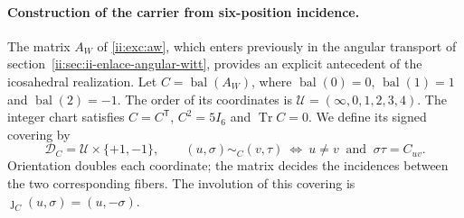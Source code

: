 \paragraph{Construction of the carrier from six-position incidence.}
\label{ii:ii:ico:construccion-firmada}
The matrix \(A_W\) of \eqref{ii:exc:aw}, which enters previously in the
angular transport of section~\ref{ii:sec:ii-enlace-angular-witt}, provides
an explicit antecedent of the icosahedral realization. Let
\(C=\operatorname{bal}(A_W)\), where
\(\operatorname{bal}(0)=0\), \(\operatorname{bal}(1)=1\) and
\(\operatorname{bal}(2)=-1\). The order of its coordinates is
\(\mathcal U=(\infty,0,1,2,3,4)\). The integer chart satisfies
\(C=C^{\mathsf T}\), \(C^2=5I_6\) and \(\operatorname{Tr}C=0\).
We define its signed covering by
\begin{equation}
 \mathcal D_C=\mathcal U\times\{+1,-1\},\qquad
 (u,\sigma)\sim_C(v,\tau)
 \ \Longleftrightarrow\ u\ne v\ \text{ and }\ \sigma\tau=C_{uv}.
 \label{ii:ii:ico:incidencia-firmada}
\end{equation}
Orientation doubles each coordinate; the matrix decides the incidences
between the two corresponding fibers. The involution of this covering
is \(\jmath_C(u,\sigma)=(u,-\sigma)\).

